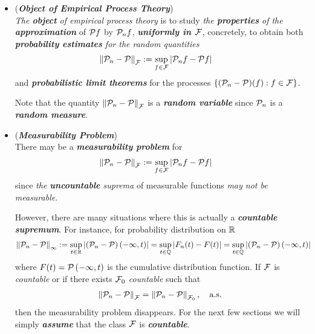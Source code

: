 \documentclass[11pt]{article}
\begin{document}
\begin{itemize}
\item \begin{remark} (\emph{\textbf{Object of Empirical Process Theory}}) \\
\emph{The \textbf{object} of empirical process theory} is to study \emph{the \textbf{properties} of the \textbf{approximation}} of ${\mathcal P} f$ by ${\mathcal P}_n f$, \emph{\textbf{uniformly in ${\mathcal F}$}}, concretely, to obtain both \emph{\textbf{probability estimates} for the random quantities}
\begin{align*}
\left\|{\mathcal P}_n  - {\mathcal P}\right\|_{{\mathcal F}} &:= \sup_{f \in {\mathcal F}}\left\lvert {\mathcal P}_n f - {\mathcal P} f \right\rvert
\end{align*}
and \emph{\textbf{probabilistic limit theorems}} for the processes $\left\{ ({\mathcal P}_n - {\mathcal P})(f) : f \in {\mathcal F}\right\}$.

Note that the quantity $\left\|{\mathcal P}_n  - {\mathcal P}\right\|_{{\mathcal F}}$ is a \emph{\textbf{random variable}} since ${\mathcal P}_n$ is a \emph{\textbf{random measure}}.
\end{remark}

\item \begin{remark} (\textbf{\emph{Measurability Problem}})\\
There may be a \emph{\textbf{measurability problem}} for 
\begin{align*}
\left\|{\mathcal P}_n  - {\mathcal P}\right\|_{{\mathcal F}} &:= \sup_{f \in {\mathcal F}}\left\lvert {\mathcal P}_n f - {\mathcal P} f \right\rvert
\end{align*}  since \emph{the \textbf{uncountable} suprema} of measurable functions \emph{may not be measurable}. 

However, there are many situations where this is actually a \emph{\textbf{countable supremum}}. For instance, for probability distribution on ${\mathbb R}$
\begin{align*}
\left\|{\mathcal P}_n  - {\mathcal P}\right\|_{\infty} &:= \sup_{t \in {\mathbb R}}\left\lvert \left({\mathcal P}_n - {\mathcal P}\right)(-\infty, t) \right\rvert =  \sup_{t \in {\mathbb Q}}\left\lvert F_n(t) - F(t) \right\rvert =  \sup_{t \in {\mathbb Q}}\left\lvert \left({\mathcal P}_n - {\mathcal P}\right)(-\infty, t) \right\rvert
\end{align*} where $F(t) = {\mathcal P}\left(-\infty, t\right)$ is the cumulative distribution function. If ${\mathcal F}$ is \emph{countable} or if there exists ${\mathcal F}_0$ \emph{countable} such that
\begin{align*}
\left\|{\mathcal P}_n  - {\mathcal P}\right\|_{{\mathcal F}}  = \left\|{\mathcal P}_n  - {\mathcal P}\right\|_{{\mathcal F}_0}, \quad \text{a.s.} 
\end{align*} then the measurability problem disappears. For the next few sections we will simply \emph{\textbf{assume}} that the class ${\mathcal F}$ is \emph{\textbf{countable}}.
\end{remark}


\end{itemize}
\end{document}
